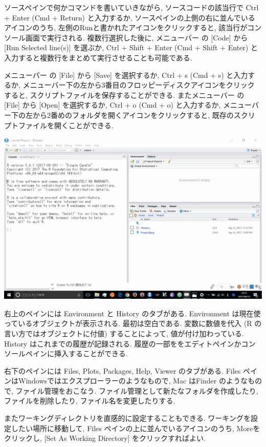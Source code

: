 \documentclass[
  letterpaper,
  xelatex,
  ja=standard, xelatex]{bxjsbook}
\begin{document}
ソースペインで何かコマンドを書いていきながら, ソースコードの該当行で
Ctrl + Enter (Cmd + Return) と入力するか,
ソースペインの上側の右に並んでいるアイコンのうち,
左側のRunと書かれたアイコンをクリックすると,
該当行がコンソール画面で実行される. 複数行選択した後に, メニューバー の
{[}Code{]} から {[}Run Selected line(s){]} を選ぶか, Ctrl + Shift +
Enter (Cmd + Shift + Enter)
と入力すると複数行をまとめて実行させることも可能である.

メニューバー の {[}File{]} から {[}Save{]} を選択するか, Ctrl + s (Cmd +
s) と入力するか,
メニューバー下の左から3番目のフロッピーディスクアイコンをクリック
すると, スクリプトファイルを保存することができる. またメニューバー の
{[}File{]} から {[}Open{]} を選択するか, Ctrl + o (Cmd + o)
と入力するか,
メニューバー下の左から2番めのフォルダを開くアイコンをクリックすると,
既存のスクリプトファイルを開くことができる.

\includegraphics{figs/rstudio_file.gif}

右上のペインには Environment と History のタブがある. Environment
は現在使っているオブジェクトが表示される. 最初は空白である.
変数に数値を代入 (R の言い方ではオブジェクトに付値) することによって,
値が付け加わっている. History はこれまでの履歴が記録される.
履歴の一部ををエディトペインかコンソールペインに挿入することができる.

右下のペインには Files, Plots, Packages, Help, Viewer のタブがある.
Files ペインはWindowsではエクスプローラーのようなもので, Mac はFinder
のようなもので, ファイル管理をおこなう.
ファイル管理として新たなフォルダを作成したり, ファイルを削除したり,
ファイル名を変更したりする.

またワーキングディレクトリを直感的に設定することもできる.
ワーキングを設定したい場所に移動して, Files
ペインの上に並んでいるアイコンのうち, Moreをクリックし, {[}Set As
Working Directory{]} をクリックすればよい.
\end{document}

